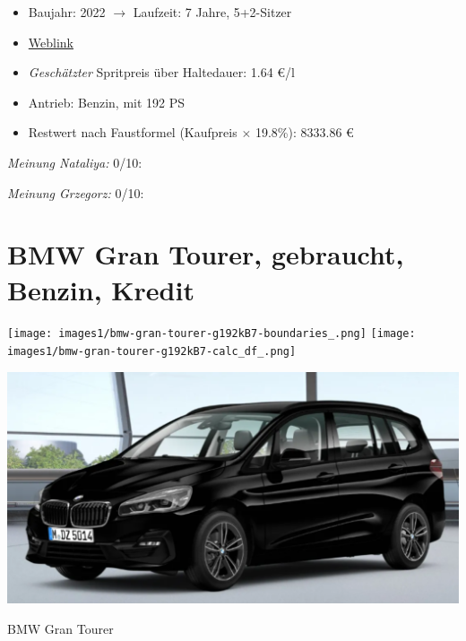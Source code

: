 \documentclass[landscape, DIV=99, 14pt]{scrartcl}
\begin{document}
\begin{itemize}
    \item Baujahr: 2022 $\rightarrow$ Laufzeit: 7 Jahre, 5+2-Sitzer
    \item \href{https://mulfinger.de/de/fahrzeugangebot/BMW/220i-GranTourer-Sport-DKG-HUD-LED-ParkAssNavi/page1/details-p5clkem9?manufacturer=5&model=2534&view=list}{Weblink}
    \item \emph{Gesch\"atzter} Spritpreis \"uber Haltedauer: 1.64 \euro{}/l
    \item Antrieb: Benzin, mit 192 PS
    \item Restwert nach Faustformel (Kaufpreis $\times$ 19.8\%): 8333.86 \euro{}
\end{itemize}

\begin{small}
\emph{Meinung Nataliya:} 0/10: 
        
\emph{Meinung Grzegorz:} 0/10: 
\end{small}

\pagebreak


\twocolumn

\section*{BMW Gran Tourer, gebraucht, Benzin, Kredit}
\begin{center}
\texttt{[image: images1/bmw-gran-tourer-g192kB7-boundaries\_.png]}
\null
\vspace{0.5cm}
\texttt{[image: images1/bmw-gran-tourer-g192kB7-calc\_df\_.png]}
\end{center}

\pagebreak
\begin{center}
\includegraphics[width=0.9\columnwidth]{cars/bmw-gran-tourer-mulfinger.png}

BMW Gran Tourer
\end{center}
\end{document}
